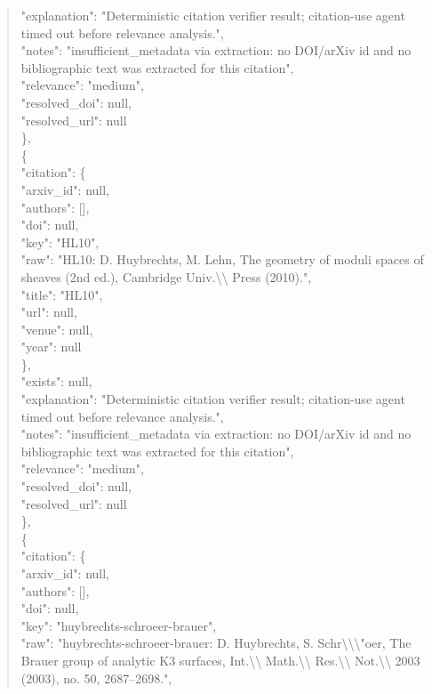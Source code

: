 \documentclass[11pt]{article}
\begin{document}
\begin{quote}
      "explanation": "Deterministic citation verifier result; citation-use agent timed out before relevance analysis.",\\
      "notes": "insufficient\_metadata via extraction: no DOI/arXiv id and no bibliographic text was extracted for this citation",\\
      "relevance": "medium",\\
      "resolved\_doi": null,\\
      "resolved\_url": null\\
    \},\\
    \{\\
      "citation": \{\\
        "arxiv\_id": null,\\
        "authors": [],\\
        "doi": null,\\
        "key": "HL10",\\
        "raw": "HL10: D. Huybrechts, M. Lehn, The geometry of moduli spaces of sheaves (2nd ed.), Cambridge Univ.\textbackslash{}\textbackslash{} Press (2010).",\\
        "title": "HL10",\\
        "url": null,\\
        "venue": null,\\
        "year": null\\
      \},\\
      "exists": null,\\
      "explanation": "Deterministic citation verifier result; citation-use agent timed out before relevance analysis.",\\
      "notes": "insufficient\_metadata via extraction: no DOI/arXiv id and no bibliographic text was extracted for this citation",\\
      "relevance": "medium",\\
      "resolved\_doi": null,\\
      "resolved\_url": null\\
    \},\\
    \{\\
      "citation": \{\\
        "arxiv\_id": null,\\
        "authors": [],\\
        "doi": null,\\
        "key": "huybrechts-schroeer-brauer",\\
        "raw": "huybrechts-schroeer-brauer: D. Huybrechts, S. Schr\textbackslash{}\textbackslash{}\textbackslash{}"oer, The Brauer group of analytic K3 surfaces, Int.\textbackslash{}\textbackslash{} Math.\textbackslash{}\textbackslash{} Res.\textbackslash{}\textbackslash{} Not.\textbackslash{}\textbackslash{} 2003 (2003), no. 50, 2687--2698.",\\

\end{quote}
\end{document}
